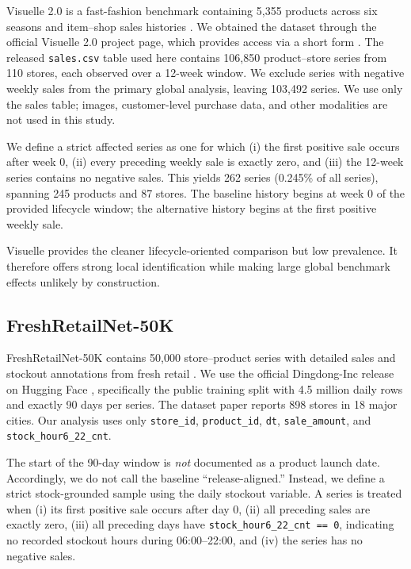 Visuelle 2.0 is a fast-fashion benchmark containing 5,355 products across six seasons and item--shop sales histories \citep{skenderi2022visuelle}. We obtained the dataset through the official Visuelle 2.0 project page, which provides access via a short form \citep{visuelle_dataset_page}. The released \texttt{sales.csv} table used here contains 106,850 product--store series from 110 stores, each observed over a 12-week window. We exclude series with negative weekly sales from the primary global analysis, leaving 103,492 series. We use only the sales table; images, customer-level purchase data, and other modalities are not used in this study.

We define a strict affected series as one for which (i) the first positive sale occurs after week 0, (ii) every preceding weekly sale is exactly zero, and (iii) the 12-week series contains no negative sales. This yields 262 series (0.245\% of all series), spanning 245 products and 87 stores. The baseline history begins at week 0 of the provided lifecycle window; the alternative history begins at the first positive weekly sale.

Visuelle provides the cleaner lifecycle-oriented comparison but low prevalence. It therefore offers strong local identification while making large global benchmark effects unlikely by construction.

\subsection{FreshRetailNet-50K}

FreshRetailNet-50K contains 50,000 store--product series with detailed sales and stockout annotations from fresh retail \citep{wang2025freshretail}. We use the official Dingdong-Inc release on Hugging Face \citep{freshretail_dataset_card}, specifically the public training split with 4.5 million daily rows and exactly 90 days per series. The dataset paper reports 898 stores in 18 major cities. Our analysis uses only \texttt{store\_id}, \texttt{product\_id}, \texttt{dt}, \texttt{sale\_amount}, and \texttt{stock\_hour6\_22\_cnt}.

The start of the 90-day window is \emph{not} documented as a product launch date. Accordingly, we do not call the baseline ``release-aligned.'' Instead, we define a strict stock-grounded sample using the daily stockout variable. A series is treated when (i) its first positive sale occurs after day 0, (ii) all preceding sales are exactly zero, (iii) all preceding days have \texttt{stock\_hour6\_22\_cnt == 0}, indicating no recorded stockout hours during 06:00--22:00, and (iv) the series has no negative sales.

